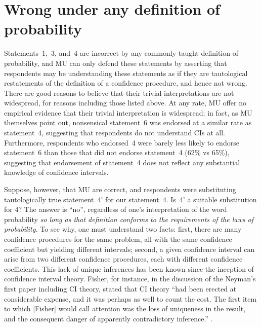 \documentclass[jou,a4paper,floatsintext,draftfirst]{apa6}\usepackage[]{graphicx}\usepackage[]{color}
\begin{document}
\section{Wrong under any definition of probability}

Statements~1,~3, and~4 are incorrect by any commonly taught definition of probability, and MU can only defend these statements by asserting that respondents may be understanding these statements as if they are tautological restatements of the definition of a confidence procedure, and hence not wrong. There are good reasons to believe that their trivial interpretations are not widespread, for reasons including those listed above. At any rate, MU offer no empirical evidence that their trivial interpretation is widespread; in fact, as MU themselves point out, nonsensical statement~6 was endorsed at a similar rate as statement~4, suggesting that respondents do not understand CIs at all. Furthermore, respondents who endorsed~4 were barely less likely to endorse statement~6 than those that did not endorse statement~4 (62\% vs 65\%), suggesting that endorsement of statement~4 does not reflect any substantial knowledge of confidence intervals.

Suppose, however, that MU are correct, and respondents were substituting tautologically true statement~4' for our statement~4. Is~4' a suitable substitution for 4? The answer is ``no'', regardless of one's interpretation of the word probability {\em so long as that definition conforms to the requirements of the laws of probability.} To see why, one must understand two facts: first, there are many confidence procedures for the same problem, all with the same confidence coefficient but yielding different intervals; second, a given confidence interval can arise from two different confidence procedures, each with different confidence coefficients. This lack of unique inferences has been known since the inception of confidence interval theory. Fisher, for instance, in the discussion of the Neyman's first paper including CI theory, stated that CI theory ``had been erected at considerable expense, and it was perhaps as well to count the cost. The first item to which [Fisher] would call attention was the loss of uniqueness in the result, and the consequent danger of apparently contradictory inference.'' \citep[][discussion at p. 618]{Neyman:1934}.
\end{document}
